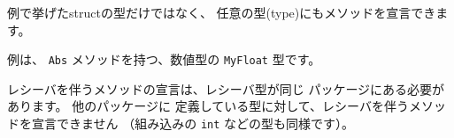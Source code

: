 例で挙げたstructの型だけではなく、
任意の型(type)にもメソッドを宣言できます。

例は、 \texttt{Abs} メソッドを持つ、数値型の \texttt{MyFloat} 型です。

レシーバを伴うメソッドの宣言は、レシーバ型が同じ
パッケージにある必要があります。 他のパッケージに
定義している型に対して、レシーバを伴うメソッドを宣言できません 
（組み込みの \texttt{int} などの型も同様です）。